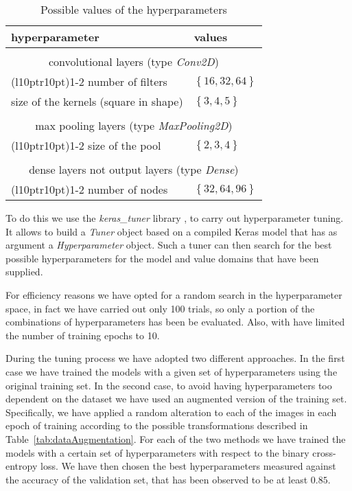 \begin{table}[h]
    \centering
    \begin{tabular}{ll}
        \textbf{hyperparameter} & \textbf{values}\\
        \midrule
        \\
        \multicolumn{2}{c}{convolutional layers (type \textit{Conv2D})} \\
        \cmidrule(l{10pt}r{10pt}){1-2} 
        number of filters & $\left\{16, 32, 64\right\}$ \\
        size of the kernels (square in shape) & $\left\{3, 4, 5\right\}$\\
        \\
        \multicolumn{2}{c}{max pooling layers (type \textit{MaxPooling2D})
        } \\
        \cmidrule(l{10pt}r{10pt}){1-2} 
        size of the pool & $\left\{2, 3, 4\right\}$\\
        \\
        \multicolumn{2}{c}{dense layers not output layers (type \textit{Dense})} \\
        \cmidrule(l{10pt}r{10pt}){1-2}
        number of nodes & $\left\{32, 64, 96\right\}$
    \end{tabular}
    \caption{Possible values of the hyperparameters}
    \label{tab:hyperparameters}
\end{table}

   
To do this we use the \textit{keras\_tuner} library \cite{omalley2019kerastuner}, to carry out hyperparameter tuning. It allows to build a \textit{Tuner} object based on a compiled Keras model that has as argument a \textit{Hyperparameter} object. Such a tuner can then search for the best possible hyperparameters for the model and value domains that have been supplied. 

For efficiency reasons we have opted for a random search in the hyperparameter space, in fact we have carried out only 100 trials, so only a portion of the combinations of hyperparameters has been be evaluated. Also, with have limited the number of training epochs to 10.

During the tuning process we have adopted two different approaches. In the first case we have trained the models with a given set of hyperparameters using the original training set. In the second case, to avoid having hyperparameters too dependent on the dataset we have used an augmented version of the training set. Specifically, we have applied a random alteration to each of the images in each epoch of training according to the possible transformations described in Table~\ref{tab:dataAugmentation}. For each of the two methods we have trained the models with a certain set of hyperparameters with respect to the binary cross-entropy loss. We have then chosen the best hyperparameters measured against the accuracy of the validation set, that has been observed to be at least $0.85$. 

